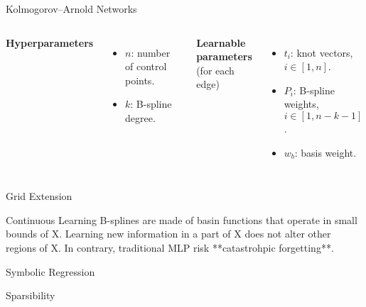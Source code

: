 \documentclass[aspectratio=169]{beamer}
\begin{document}

\begin{frame}{Kolmogorov–Arnold Networks}
	
	\begin{columns}[T,onlytextwidth]
		
		\centering
		\resizebox{\linewidth}{!}{}
		
		
		\textbf{Hyperparameters}
		\begin{itemize}
			\item $n$: number of control points.
			\item $k$: B-spline degree.
		\end{itemize}
		
		\vspace{0.8em}
		\textbf{Learnable parameters}\\(for each edge)
		\begin{itemize}
			\item $t_i$: knot vectors, $i \in [1, n]$.
			\item $P_i$: B-spline weights, $i \in [1, n-k-1]$.
			\item $w_b$: basis weight.
		\end{itemize}
		
	\end{columns}
	
\end{frame}


\begin{frame}{Grid Extension}

\end{frame}


\begin{frame}{Continuous Learning}
B-splines are made of basin functions that operate in small bounds of X. Learning new information in a part of X does not alter other regions of X. In contrary, traditional MLP risk **catastrohpic forgetting**.
\end{frame}


\begin{frame}{Symbolic Regression}

\end{frame}


\begin{frame}{Sparsibility}

\end{frame}
\end{document}
